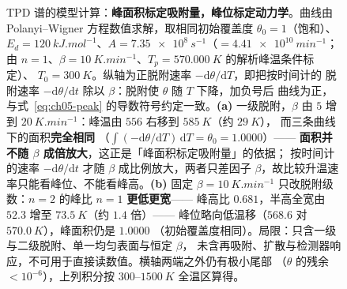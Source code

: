 \begin{figure}[htbp]
\caption{TPD 谱的模型计算：\textbf{峰面积标定吸附量，峰位标定动力学}。曲线由
Polanyi--Wigner 方程数值求解，取相同初始覆盖度 $\theta_0=1$（饱和）、
$E_d=\qty{120}{kJ.mol^{-1}}$、$A=\qty{7.35e8}{s^{-1}}$（$=\qty{4.41e10}{min^{-1}}$；
由 $n=1$、$\beta=\qty{10}{K.min^{-1}}$、$T_p=\qty{570.000}{K}$ 的解析峰温条件标定）、
$T_0=\qty{300}{K}$。纵轴为正脱附速率 $-\mathrm{d}\theta/\mathrm{d}T$，即把按时间计的
脱附速率 $-\mathrm{d}\theta/\mathrm{d}t$ 除以 $\beta$：脱附使 $\theta$ 随 $T$ 下降，加负号后
曲线为正，与式~\eqref{eq:ch05-peak} 的导数符号约定一致。\textbf{(a)} 一级脱附，$\beta$ 由 $5$ 增到
$\qty{20}{K.min^{-1}}$：峰温由 $556$ 右移到 $\qty{585}{K}$（约 $\qty{29}{K}$），
而三条曲线下的面积\textbf{完全相同}
（$\int(-\mathrm{d}\theta/\mathrm{d}T)\,\mathrm{d}T=\theta_0=1.0000$）——
\textbf{面积并不随 $\beta$ 成倍放大}，这正是「峰面积标定吸附量」的依据；
按时间计的速率 $-\mathrm{d}\theta/\mathrm{d}t$ 才随 $\beta$ 成比例放大，两者只差因子
$\beta$，故比较升温速率只能看峰位、不能看峰高。\textbf{(b)} 固定
$\beta=\qty{10}{K.min^{-1}}$ 只改脱附级数：$n=2$ 的峰比 $n=1$ \textbf{更低更宽}——
峰高比 $0.681$，半高全宽由 $52.3$ 增至 $\qty{73.5}{K}$（约 $1.4$ 倍）——
峰位略向低温移（$568.6$ 对 $\qty{570.0}{K}$），峰面积仍是 $1.0000$
（初始覆盖度相同）。局限：只含一级与二级脱附、单一均匀表面与恒定 $\beta$，
未含再吸附、扩散与检测器响应，不可用于直接读数值。横轴两端之外仍有极小尾部
（$\theta$ 的残余 $<10^{-6}$），上列积分按 $300$--$\qty{1500}{K}$ 全温区算得。\modelmark
{}}
\label{fig:ch05-tpd}
\end{figure}

